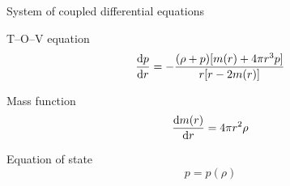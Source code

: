 \documentclass{beamer}
\let\svthefootnote\thefootnote
\newcommand\blankfootnote[1]{%
  \let\thefootnote\relax\footnotetext{#1}%
  \let\thefootnote\svthefootnote%
}
\begin{document}

\begin{frame}{System of coupled differential equations}

\begin{block}{T--O--V equation}
\begin{displaymath}
  \dv{p}{r} =
 -\frac{(\rho + p) [m(r) + 4 \pi r^3 p]}{r [r - 2m(r)]}
\end{displaymath}
\end{block}

\begin{block}{Mass function}
\begin{displaymath}
  \dv{m(r)}{r} = 4 \pi r^2 \rho
\end{displaymath}
\end{block}

\begin{block}{Equation of state}
\begin{displaymath}
  p = p(\rho)
\end{displaymath}
\end{block}

\blankfootnote{\textcite[pp. 261--262, 264]{Schutz}}



\end{frame}


\end{document}
